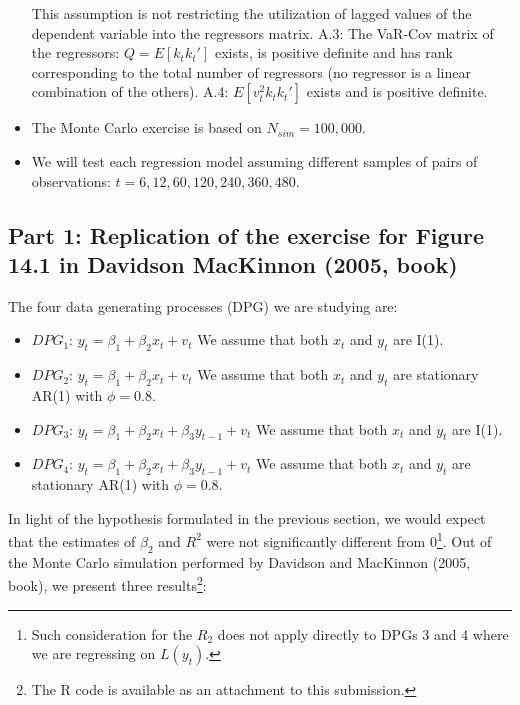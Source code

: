 \documentclass[12pt]{article}
\begin{document}
\begin{itemize}
			This assumption is not restricting the utilization of lagged values of the dependent variable into the regressors matrix.
			\subitem A.3: The VaR-Cov matrix of the regressors: $Q= E[k_{t}k_{t}']$ exists, is positive definite and has rank corresponding to the total number of regressors (no regressor is a linear combination of the others).
			\subitem A.4: $E[v_{t}^2k_{t}k_{t}']$ exists and is positive definite.
		\item The Monte Carlo exercise is based on $N_{sim} = 100,000$.
		\item We will test each regression model assuming different samples of pairs of observations: $t=6, 12, 60, 120, 240, 360, 480$.      	 	
	\end{itemize}
	\subsection{Part 1: Replication of the exercise for Figure 14.1 in Davidson MacKinnon (2005, book)}
	The four data generating processes (DPG) we are studying are:
	\begin{itemize}
	\item $DPG_1$: $y_{t} = \beta_{1} +\beta_{2}x_{t} + v_{t}$
		\subitem We assume that both $x_t$ and $y_t$ are I(1).
	\item $DPG_2$: $y_{t} = \beta_{1} +\beta_{2}x_{t} + v_{t}$
		\subitem We assume that both $x_t$ and $y_t$ are stationary AR(1) with $\phi = 0.8$.
	\item $DPG_3$: $y_{t} = \beta_{1} +\beta_{2}x_{t} + \beta_{3}y_{t-1} + v_{t}$
		\subitem We assume that both $x_t$ and $y_t$ are I(1).
	\item $DPG_4$: $y_{t} = \beta_{1} +\beta_{2}x_{t} + \beta_{3}y_{t-1} + v_{t}$
		\subitem We assume that both $x_t$ and $y_t$ are stationary AR(1) with $\phi = 0.8$. 	
	\end{itemize}	
	In light of the hypothesis formulated in the previous section, we would expect that the estimates of $\beta_{2}$ and $R^2$ were not significantly different from 0\footnote{Such consideration for the $R_2$ does not apply directly to DPGs 3 and 4 where we are regressing on $L(y_{t})$.}.
	Out of the Monte Carlo simulation performed by Davidson and MacKinnon (2005, book), we present three results\footnote{The R code is available as an attachment to this submission.}:
\end{document}
